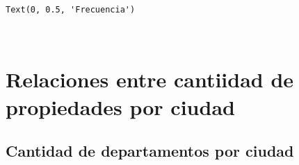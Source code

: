 \documentclass[11pt]{article}
\newcommand{\prompt}[4]{
        \llap{{\color{#2}[#3]: #4}}\vspace{-1.25em}
    }
\begin{document}
            \begin{tcolorbox}[breakable, boxrule=.5pt, size=fbox, pad at break*=1mm, opacityfill=0]
\prompt{Out}{outcolor}{504}{\hspace{3.5pt}}
\begin{Verbatim}[commandchars=\\\{\}]
Text(0, 0.5, 'Frecuencia')
\end{Verbatim}
\end{tcolorbox}
        
    \begin{center}
    \end{center}
    { \hspace*{\fill} \\}
    
    \section{Relaciones entre cantiidad de propiedades por
ciudad}\label{relaciones-entre-cantiidad-de-propiedades-por-ciudad}

\subsection{Cantidad de departamentos por
ciudad}\label{cantidad-de-departamentos-por-ciudad}
\end{document}
